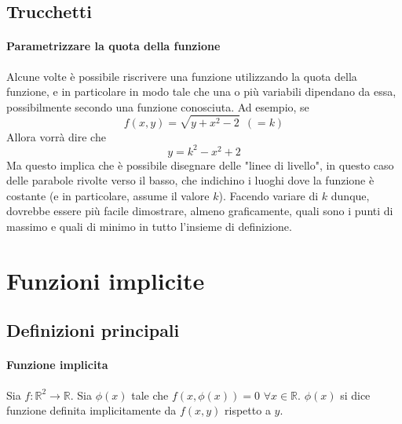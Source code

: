 \documentclass[a4paper,12pt]{book}
\begin{document}
\subsection{Trucchetti}
\paragraph{Parametrizzare la quota della funzione}
Alcune volte è possibile riscrivere una funzione utilizzando la quota della funzione, e in particolare in modo tale che una o più variabili dipendano da essa, possibilmente secondo una funzione conosciuta. Ad esempio, se
$$ f(x, y) = \sqrt{y + x^2 - 2}\ \ (= k)$$
Allora vorrà dire che
$$ y = k^2 - x^2 +2 $$
Ma questo implica che è possibile disegnare delle "linee di livello", in questo caso delle parabole rivolte verso il basso, che indichino i luoghi dove la funzione è costante (e in particolare, assume il valore $k$). Facendo variare di $k$ dunque, dovrebbe essere più facile dimostrare, almeno graficamente, quali sono i punti di massimo e quali di minimo in tutto l'insieme di definizione.
\section{Funzioni implicite}
\subsection{Definizioni principali}
\paragraph{Funzione implicita}
Sia $f: \mathbb{R}^2 \rightarrow \mathbb{R}$.
Sia $\phi(x)$ tale che $f(x, \phi(x)) = 0$ $\forall x \in \mathbb{R}$. $\phi(x)$ si dice funzione definita implicitamente da $f(x, y)$ rispetto a $y$.
\end{document}
